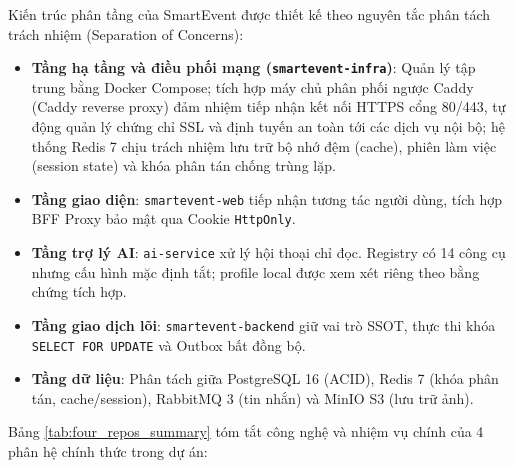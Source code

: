 Kiến trúc phân tầng của SmartEvent được thiết kế theo nguyên tắc phân tách trách nhiệm (Separation of Concerns):
\begin{itemize}[nosep]
  \item \textbf{Tầng hạ tầng và điều phối mạng (\texttt{smartevent-infra})}: Quản lý tập trung bằng Docker Compose; tích hợp máy chủ phân phối ngược Caddy (Caddy reverse proxy) đảm nhiệm tiếp nhận kết nối HTTPS cổng 80/443, tự động quản lý chứng chỉ SSL và định tuyến an toàn tới các dịch vụ nội bộ; hệ thống Redis 7 chịu trách nhiệm lưu trữ bộ nhớ đệm (cache), phiên làm việc (session state) và khóa phân tán chống trùng lặp.
  \item \textbf{Tầng giao diện}: \texttt{smartevent-web} tiếp nhận tương tác người dùng, tích hợp BFF Proxy bảo mật qua Cookie \texttt{HttpOnly}.
  \item \textbf{Tầng trợ lý AI}: \texttt{ai-service} xử lý hội thoại chỉ đọc. Registry có 14 công cụ nhưng cấu hình mặc định tắt; profile local được xem xét riêng theo bằng chứng tích hợp.
  \item \textbf{Tầng giao dịch lõi}: \texttt{smartevent-backend} giữ vai trò SSOT, thực thi khóa \texttt{SELECT FOR UPDATE} và Outbox bất đồng bộ.
  \item \textbf{Tầng dữ liệu}: Phân tách giữa PostgreSQL 16 (ACID), Redis 7 (khóa phân tán, cache/session), RabbitMQ 3 (tin nhắn) và MinIO S3 (lưu trữ ảnh).
\end{itemize}

Bảng \ref{tab:four_repos_summary} tóm tắt công nghệ và nhiệm vụ chính của 4 phân hệ chính thức trong dự án:

